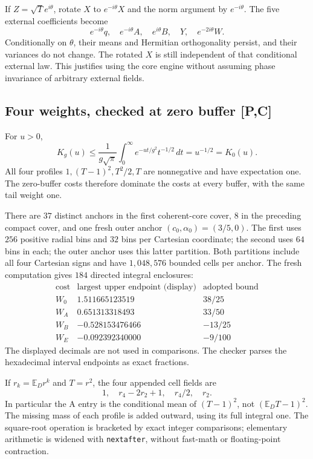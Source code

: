 If \(Z=\sqrt T e^{i\theta}\), rotate \(X\) to \(e^{-i\theta}X\) and the norm
argument by \(e^{-i\theta}\). The five external coefficients become
\[
e^{-i\theta}q,\quad e^{-i\theta}A,\quad e^{i\theta}B,\quad
Y,\quad e^{-2i\theta}W.
\]
Conditionally on \(\theta\), their means and Hermitian orthogonality persist,
and their variances do not change. The rotated \(X\) is still independent of
that conditional external law. This justifies using the core engine without
assuming phase invariance of arbitrary external fields.

\subsection{Four weights, checked at zero buffer [P,C]}
For \(u>0\),
\[
K_g(u)\le\frac1{g\sqrt\pi}\int_0^\infty
e^{-ut/g^2}t^{-1/2}\,dt=u^{-1/2}=K_0(u).
\]
All four profiles \(1,(T-1)^2,T^2/2,T\) are nonnegative and have expectation
one. The zero-buffer costs therefore dominate the costs at every buffer,
with the same tail weight one.

There are \(37\) distinct anchors in the first coherent-core cover,
\(8\) in the preceding compact cover, and one fresh outer anchor
\((c_0,\alpha_0)=(3/5,0)\). The first uses \(256\) positive
radial bins and \(32\) bins per Cartesian coordinate; the second uses
\(64\) bins in each; the outer anchor uses this latter partition.
Both partitions include all four Cartesian signs and have
\(1{,}048{,}576\) bounded cells per anchor.
The fresh computation gives \(184\) directed integral enclosures:
\[
\begin{array}{c|r|c}
\text{cost}&\text{largest upper endpoint (display)}&\text{adopted bound}\\\hline
W_0&1.511665123519&38/25\\
W_A&0.651313318493&33/50\\
W_B&-0.528153476466&-13/25\\
W_E&-0.092392340000&-9/100
\end{array}
\]
The displayed decimals are not used in comparisons.
The checker parses the hexadecimal interval endpoints as exact fractions.

If \(r_k=\mathbb E_D r^k\) and \(T=r^2\), the four appended cell fields are
\[
1,\quad r_4-2r_2+1,\quad r_4/2,\quad r_2.
\]
In particular the A entry is the conditional mean of \((T-1)^2\), not
\((\mathbb E_DT-1)^2\). The missing mass of each profile is added outward,
using its full integral one. The square-root operation is bracketed by exact
integer comparisons; elementary arithmetic is widened with
\texttt{nextafter}, without fast-math or floating-point contraction.

